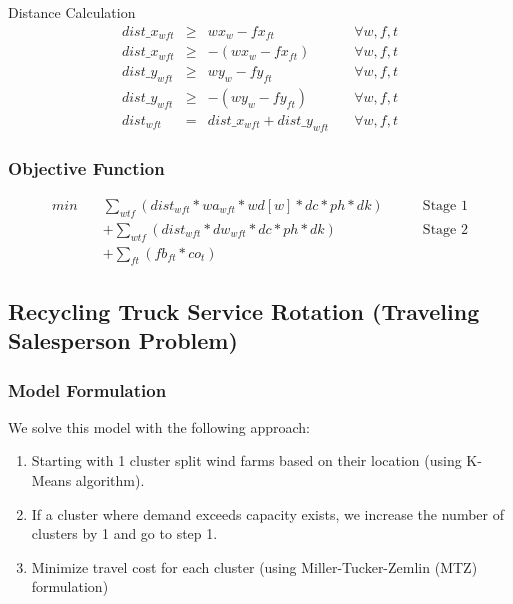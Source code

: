 Distance Calculation
\vspace{-5pt}
\begin{equation}
\begin{aligned}
	dist\_x_{wft} 	&\ge	& wx_{w} - fx_{ft} 			& \quad \forall w,f,t  \\
	dist\_x_{wft} 	&\ge	& -( wx_{w} - fx_{ft}) 			&\quad \forall w,f,t  \\
	dist\_y_{wft} 	&\ge	& wy_{w} - fy_{ft} 			& \quad \forall w,f,t \\
	dist\_y_{wft} 	&\ge	& -(wy_{w} - fy_{ft}) 			&\quad \forall w,f,t \\
	dist_{wft} 		&=  	& dist\_x_{wft} + dist\_y_{wft} 	& \quad \forall w,f,t 
\end{aligned}
\end{equation}


\subsubsection{Objective Function}
\vspace{-15pt}
\begin{equation}
\begin{aligned}
	min	\quad 	&	\sum_{wtf} (dist_{wft} * wa_{wft} * wd[w] * dc *  ph * dk)		& \quad \quad \text{Stage 1} \\
			 	&	+ \sum_{wtf} (dist_{wft} * dw_{wft} * dc *  ph * dk)				& \quad \quad \text{Stage 2} \\
        				& 	+ \sum_{ft} (fb_{ft} * co_{t})
\end{aligned}
\end{equation}



\subsection{Recycling Truck Service Rotation (Traveling Salesperson Problem)}
\subsubsection{Model Formulation}
We solve this model with the following approach:  
\begin{enumerate}[noitemsep]
   \item Starting with 1 cluster split wind farms based on their location (using K-Means algorithm).
   \item If a cluster where demand exceeds capacity exists, we increase the number of clusters by 1 and go to step 1. 
   \item  Minimize travel cost for each cluster (using Miller-Tucker-Zemlin (MTZ) formulation)
\end{enumerate}

